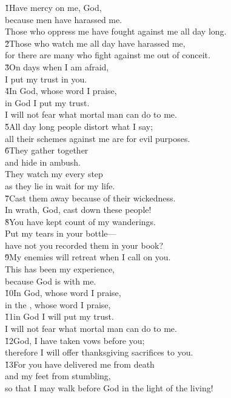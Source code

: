\begin{poetry}
\poeml \v{1}Have mercy on me, God, \\
\poemll    because men have harassed me. \\
\poemlll       Those who oppress me have fought against me all day long. \\
\poeml \v{2}Those who watch me all day have harassed me, \\
\poemll    for there are many who fight against me out of conceit. \\
\poeml \v{3}On days when I am afraid, \\
\poemll    I put my trust in you. \\
\poeml \v{4}In God, whose word I praise, \\
\poemll    in God I put my trust. \\
\poemlll       I will not fear what mortal man can do to me. \\
\poeml \v{5}All day long people distort what I say; \\
\poemll    all their schemes against me are for evil purposes. \\
\poeml \v{6}They gather together \\
\poemll    and hide in ambush. \\
\poeml They watch my every step \\
\poemll    as they lie in wait for my life. \\
\poeml \v{7}Cast them away because of their wickedness. \\
\poemll    In wrath, God, cast down these people! \\
\poeml \v{8}You have kept count of my wanderings. \\
\poemll    Put my tears in your bottle--- \\
\poemlll       have not you recorded them in your book? \\
\poeml \v{9}My enemies will retreat when I call on you. \\
\poemll    This has been my experience, \\
\poemlll       because God is with me. \\
\poeml \v{10}In God, whose word I praise, \\
\poemll    in the , whose word I praise, \\
\poeml \v{11}in God I will put my trust. \\
\poemll    I will not fear what mortal man can do to me. \\
\poeml \v{12}God, I have taken vows before you; \\
\poemll    therefore I will offer thanksgiving sacrifices to you. \\
\poeml \v{13}For you have delivered me from death \\
\poemll    and my feet from stumbling, \\
\poemlll       so that I may walk before God in the light of the living!
\end{poetry}
